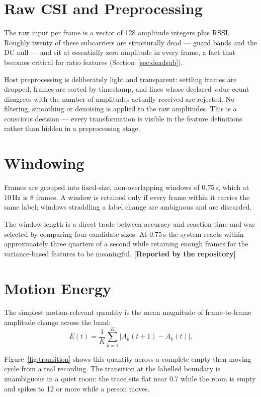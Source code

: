 \documentclass[11pt,a4paper,oneside]{report}
\newcommand{\evidencetag}[2]{{\small\sffamily\bfseries\textcolor{#1}{[#2]}}}
\newcommand{\Repo}{\evidencetag{neutralgrey}{Reported by the repository}}
\begin{document}
\section{Raw CSI and Preprocessing}

The raw input per frame is a vector of 128 amplitude integers plus RSSI.
Roughly twenty of these subcarriers are structurally dead --- guard bands and
the DC null --- and sit at essentially zero amplitude in every frame, a fact
that becomes critical for ratio features (Section~\ref{sec:deadsub}).

Host preprocessing is deliberately light and transparent: settling frames are
dropped, frames are sorted by timestamp, and lines whose declared value count
disagrees with the number of amplitudes actually received are rejected. No
filtering, smoothing or denoising is applied to the raw amplitudes. This is a
conscious decision --- every transformation is visible in the feature
definitions rather than hidden in a preprocessing stage.

\section{Windowing}

Frames are grouped into fixed-size, non-overlapping windows of 0.75\,s, which
at 10\,Hz is 8 frames. A window is retained only if every frame within it
carries the same label; windows straddling a label change are ambiguous and are
discarded.

The window length is a direct trade between accuracy and reaction time and was
selected by comparing four candidate sizes. At 0.75\,s the system reacts within
approximately three quarters of a second while retaining enough frames for the
variance-based features to be meaningful. \Repo

\section{Motion Energy}

The simplest motion-relevant quantity is the mean magnitude of frame-to-frame
amplitude change across the band:
\begin{equation}
  E(t) = \frac{1}{K}\sum_{k=1}^{K} \bigl| A_k(t+1) - A_k(t) \bigr| .
  \label{eq:energy}
\end{equation}

Figure~\ref{fig:transition} shows this quantity across a complete
empty-then-moving cycle from a real recording. The transition at the labelled
boundary is unambiguous in a quiet room: the trace sits flat near 0.7 while the
room is empty and spikes to 12 or more while a person moves.
\end{document}
